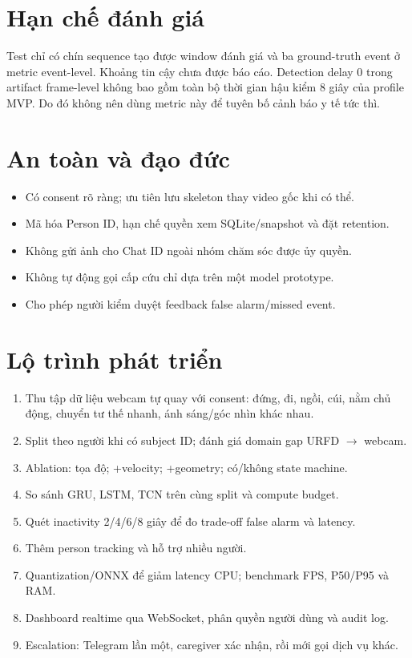 \documentclass[12pt,a4paper,oneside]{report}
\begin{document}
\section{Hạn chế đánh giá}

Test chỉ có chín sequence tạo được window đánh giá và ba ground-truth event ở
metric event-level. Khoảng tin cậy chưa được báo cáo. Detection delay 0 trong
artifact frame-level không bao gồm toàn bộ thời gian hậu kiểm 8 giây của profile
MVP. Do đó không nên dùng metric này để tuyên bố cảnh báo y tế tức thì.

\section{An toàn và đạo đức}

\begin{itemize}
  \item Có consent rõ ràng; ưu tiên lưu skeleton thay video gốc khi có thể.
  \item Mã hóa Person ID, hạn chế quyền xem SQLite/snapshot và đặt retention.
  \item Không gửi ảnh cho Chat ID ngoài nhóm chăm sóc được ủy quyền.
  \item Không tự động gọi cấp cứu chỉ dựa trên một model prototype.
  \item Cho phép người kiểm duyệt feedback false alarm/missed event.
\end{itemize}

\section{Lộ trình phát triển}

\begin{enumerate}
  \item Thu tập dữ liệu webcam tự quay với consent: đứng, đi, ngồi, cúi, nằm chủ
  động, chuyển tư thế nhanh, ánh sáng/góc nhìn khác nhau.
  \item Split theo người khi có subject ID; đánh giá domain gap URFD $\to$ webcam.
  \item Ablation: tọa độ; +velocity; +geometry; có/không state machine.
  \item So sánh GRU, LSTM, TCN trên cùng split và compute budget.
  \item Quét inactivity 2/4/6/8 giây để đo trade-off false alarm và latency.
  \item Thêm person tracking và hỗ trợ nhiều người.
  \item Quantization/ONNX để giảm latency CPU; benchmark FPS, P50/P95 và RAM.
  \item Dashboard realtime qua WebSocket, phân quyền người dùng và audit log.
  \item Escalation: Telegram lần một, caregiver xác nhận, rồi mới gọi dịch vụ khác.
\end{enumerate}
\end{document}
